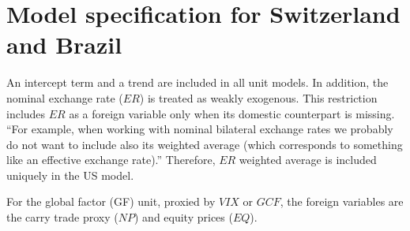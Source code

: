 \documentclass[a4paper, twoside]{templates/ociamthesis}
\begin{document}
\clearpage

\hypertarget{appendixd1}{%
\section{Model specification for Switzerland and Brazil}\label{appendixd1}}

An intercept term and a trend are included in all unit models. In addition, the nominal exchange rate (\(ER\)) is treated as weakly exogenous. This restriction includes \(ER\) as a foreign variable only when its domestic counterpart is missing. ``For example, when working with nominal bilateral exchange rates we probably do not want to include also its weighted average (which corresponds to something like an effective exchange rate).'' \autocite{bock2021a} Therefore, \(ER\) weighted average is included uniquely in the US model.

For the global factor (GF) unit, proxied by \(VIX\) or \(GCF\), the foreign variables are the carry trade proxy (\(NP\)) and equity prices (\(EQ\)).
\end{document}
